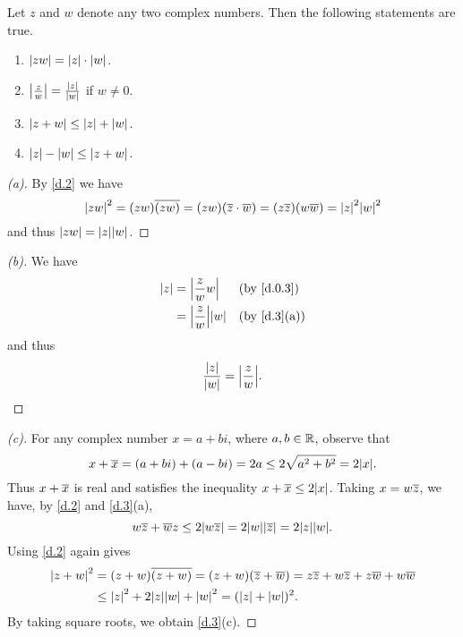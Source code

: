 \begin{thm}\label{d.3}
	Let \(z\) and \(w\) denote any two complex numbers.
	Then the following statements are true.
	\begin{enumerate}
		\item \(\left\lvert zw\right\rvert = \left\lvert z\right\rvert \cdot \left\lvert w\right\rvert\).
		\item \(\left\lvert\frac{z}{w}\right\rvert = \frac{\left\lvert z\right\rvert}{\left\lvert w\right\rvert}\) if \(w \neq 0\).
		\item \(\left\lvert z + w\right\rvert \leq \left\lvert z\right\rvert + \left\lvert w\right\rvert\).
		\item \(\left\lvert z\right\rvert - \left\lvert w\right\rvert \leq \left\lvert z + w\right\rvert\).
	\end{enumerate}
\end{thm}

\begin{proof}[(a)]
	By \cref{d.2} we have
	\[
		\abs{zw}^2 = (zw) \conj{(zw)} = (zw) (\conj{z} \cdot \conj{w}) = (z \conj{z}) (w \conj{w}) = \abs{z}^2 \abs{w}^2
	\]
	and thus \(\abs{zw} = \abs{z} \abs{w}\).
\end{proof}

\begin{proof}[(b)]
	We have
	\begin{align*}
		\abs{z} & = \abs{\frac{z}{w} w}       &  & \by{d.0.3}  \\
		        & = \abs{\frac{z}{w}} \abs{w} &  & \by{d.3}[a]
	\end{align*}
	and thus
	\[
		\frac{\abs{z}}{\abs{w}} = \abs{\frac{z}{w}}.
	\]
\end{proof}

\begin{proof}[(c)]
	For any complex number \(x = a + bi\), where \(a, b \in \mathbb{R}\), observe that
	\[
		x + \conj{x} = (a + bi) + (a - bi) = 2a \leq 2 \sqrt{a^2 + b^2} = 2 \abs{x}.
	\]
	Thus \(x + \overline{x}\) is real and satisfies the inequality \(x + \conj{x} \leq 2 \abs{x}\).
	Taking \(x = w \overline{z}\), we have, by \cref{d.2} and \cref{d.3}(a),
	\[
		w \conj{z} + \conj{w} z \leq 2 \abs{w \conj{z}} = 2 \abs{w} \abs{\conj{z}} = 2 \abs{z} \abs{w}.
	\]
	Using \cref{d.2} again gives
	\begin{align*}
		\abs{z + w}^2 & = (z + w) \conj{(z + w)} = (z + w) (\conj{z} + \conj{w}) = z \conj{z} + w \conj{z} + z \conj{w} + w \conj{w} \\
		              & \leq \abs{z}^2 + 2 \abs{z} \abs{w} + \abs{w}^2 = (\abs{z} + \abs{w})^2.
	\end{align*}
	By taking square roots, we obtain \cref{d.3}(c).
\end{proof}

